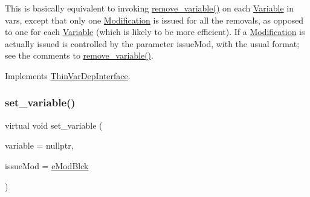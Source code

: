 This is basically equivalent to invoking \mbox{\hyperlink{class_s_m_spp__di__unipi__it_1_1_one_var_constraint_ade52d9ebf47de895377b860ef4d3a607}{remove\+\_\+variable()}} on each \mbox{\hyperlink{class_s_m_spp__di__unipi__it_1_1_variable}{Variable}} in vars, except that only one \mbox{\hyperlink{class_s_m_spp__di__unipi__it_1_1_modification}{Modification}} is issued for all the removals, as opposed to one for each \mbox{\hyperlink{class_s_m_spp__di__unipi__it_1_1_variable}{Variable}} (which is likely to be more efficient). If a \mbox{\hyperlink{class_s_m_spp__di__unipi__it_1_1_modification}{Modification}} is actually issued is controlled by the parameter issue\+Mod, with the usual format; see the comments to \mbox{\hyperlink{class_s_m_spp__di__unipi__it_1_1_one_var_constraint_ade52d9ebf47de895377b860ef4d3a607}{remove\+\_\+variable()}}. 

Implements \mbox{\hyperlink{group___thin_var_dep_interface___c_l_a_s_s_e_s_ga4f21d262d25ed93ccc289134f2618ba9}{Thin\+Var\+Dep\+Interface}}.

\mbox{\label{class_s_m_spp__di__unipi__it_1_1_one_var_constraint_a1a242762e0f2821e2676a295a766fdb6}} 
\subsubsection{\texorpdfstring{set\+\_\+variable()}{set\_variable()}}
{\footnotesize\ttfamily virtual void set\+\_\+variable (\begin{DoxyParamCaption}\item[{\mbox{\hyperlink{class_s_m_spp__di__unipi__it_1_1_col_variable}{Col\+Variable}} $\ast$const}]{variable = {\ttfamily nullptr},  }\item[{\mbox{\hyperlink{group___modification___t_y_p_e_s_ga544246d8c462e9a2d817c2c30797968f}{c\+\_\+\+Mod\+Param}}}]{issue\+Mod = {\ttfamily \mbox{\hyperlink{group___modification___t_y_p_e_s_gga48fddcdd03a03f49b7e389ca1ed938d4a21b14b26b1c0093a0905f6fc010bad29}{e\+Mod\+Blck}}} }\end{DoxyParamCaption})\hspace{0.3cm}{\ttfamily [virtual]}}



